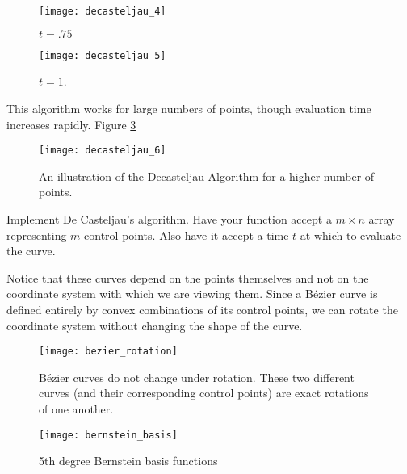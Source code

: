 \begin{figure}
\texttt{[image: decasteljau\_4]}
\caption{$t=.75$}
\label{bezier:decasteljau_4}
\end{figure}

\begin{figure}
\texttt{[image: decasteljau\_5]} 
\caption{$t=1$.}
\label{bezier:decasteljau_5}
\end{figure}

This algorithm works for large numbers of points, though evaluation time increases rapidly.
Figure \ref{fig:bezier:decasteljau_many_points}

\begin{figure}
\texttt{[image: decasteljau\_6]}
\caption{An illustration of the Decasteljau Algorithm for a higher number of points.}
\label{fig:bezier:decasteljau_many_points}
\end{figure}

\begin{problem}
Implement De Casteljau's algorithm.
Have your function accept a $m \times n$ array representing $m$ control points.
Also have it accept a time $t$ at which to evaluate the curve.
\end{problem}

\begin{comment}
\begin{problem}
Use a slider bar to interactively show how the algorithm works.
Use Matplotlib's \li{ginput} function to get the control points for the graph.
\end{problem}
\end{comment}

Notice that these curves depend on the points themselves and not on the coordinate system with which we are viewing them.
Since a B\'{e}zier curve is defined entirely by convex combinations of its control points, we can rotate the coordinate system without changing the shape of the curve.

\begin{figure}
\texttt{[image: bezier\_rotation]}
\caption{B\'{e}zier curves do not change under rotation.
These two different curves (and their corresponding control points) are exact rotations of one another.}
\end{figure}

\begin{figure}
\texttt{[image: bernstein\_basis]}
\caption{5th degree Bernstein basis functions}
\end{figure}

